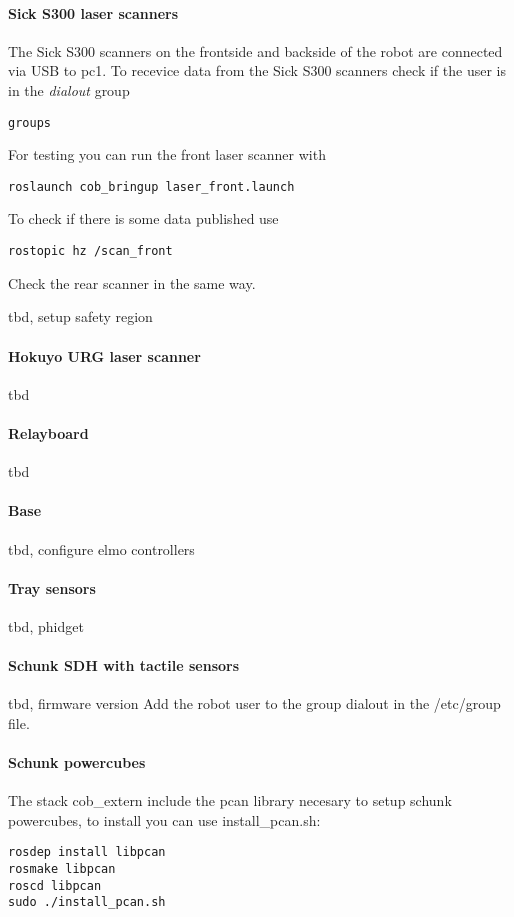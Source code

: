 \paragraph{Sick S300 laser scanners}
The Sick S300 scanners on the frontside and backside of the robot are connected via USB to pc1. To recevice data from the Sick S300 scanners check if the user is in the \textit{dialout} group
\begin{lstlisting}
groups
\end{lstlisting}

For testing you can run the front laser scanner with
\begin{lstlisting}
roslaunch cob_bringup laser_front.launch
\end{lstlisting}

To check if there is some data published use
\begin{lstlisting}
rostopic hz /scan_front
\end{lstlisting}

Check the rear scanner in the same way.

tbd, setup safety region

\paragraph{Hokuyo URG laser scanner}
tbd

\paragraph{Relayboard}
tbd

\paragraph{Base}
tbd, configure elmo controllers

\paragraph{Tray sensors}
tbd, phidget

\paragraph{Schunk SDH with tactile sensors}
tbd, firmware version
Add the robot user to the group dialout in the /etc/group file.

\paragraph{Schunk powercubes}
The stack cob\_extern include the pcan library necesary to setup schunk powercubes, to install you can use install\_pcan.sh: 
\begin{lstlisting}
rosdep install libpcan
rosmake libpcan
roscd libpcan
sudo ./install_pcan.sh
\end{lstlisting}

